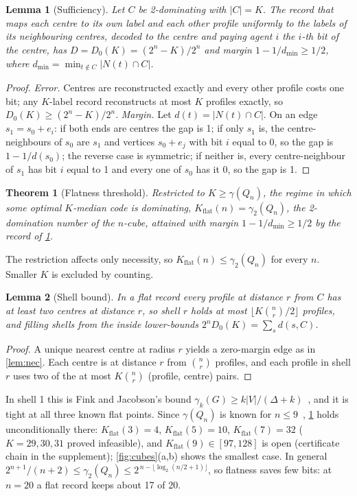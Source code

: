 \documentclass[sigconf,anonymous,acmthm=false]{aamas}
\theoremstyle{acmplain}
\newtheorem{theorem}{Theorem}
\newtheorem{lemma}{Lemma}
\theoremstyle{acmdefinition}
\newcommand{\Kflat}{K_{\mathrm{flat}}}
\newcommand{\dmin}{d_{\min}}
\begin{document}
\begin{lemma}[Sufficiency]\label{lem:suff}
Let $C$ be 2-dominating with $|C|=K$. The record that maps each centre to its own label and
each other profile uniformly to the labels of its neighbouring centres, decoded to the centre
and paying agent $i$ the $i$-th bit of the centre, has $D=D_0(K)=(2^n-K)/2^n$ and margin
$1-1/\dmin\ge1/2$, where $\dmin=\min_{t\notin C}|N(t)\cap C|$.
\end{lemma}
\begin{proof}
\emph{Error.} Centres are reconstructed exactly and every other profile costs one bit; any
$K$-label record reconstructs at most $K$ profiles exactly, so $D_0(K)\ge(2^n-K)/2^n$.
\emph{Margin.} Let $d(t)=|N(t)\cap C|$. On an edge $s_1=s_0+e_i$: if both ends are centres the
gap is 1; if only $s_1$ is, the centre-neighbours of $s_0$ are $s_1$ and vertices $s_0+e_j$
with bit $i$ equal to 0, so the gap is $1-1/d(s_0)$; the reverse case is symmetric; if
neither is, every centre-neighbour of $s_1$ has bit $i$ equal to 1 and every one of $s_0$ has
it 0, so the gap is 1.
\end{proof}

\begin{theorem}[Flatness threshold]\label{thm:flat}
Restricted to $K\ge\gamma(Q_n)$, the regime in which some optimal $K$-median code is
dominating, $\Kflat(n)=\gamma_2(Q_n)$, the 2-domination number of the $n$-cube, attained with
margin $1-1/\dmin\ge1/2$ by the record of \cref{lem:suff}.
\end{theorem}

The restriction affects only necessity, so $\Kflat(n)\le\gamma_2(Q_n)$ for every $n$. Smaller
$K$ is excluded by counting.

\begin{lemma}[Shell bound]\label{lem:shell}
In a flat record every profile at distance $r$ from $C$ has at least two centres at distance
$r$, so shell $r$ holds at most $\lfloor K\binom nr/2\rfloor$ profiles, and filling shells from
the inside lower-bounds $2^nD_0(K)=\sum_sd(s,C)$.
\end{lemma}
\begin{proof}
A unique nearest centre at radius $r$ yields a zero-margin edge as in \cref{lem:nec}. Each
centre is at distance $r$ from $\binom nr$ profiles, and each profile in shell $r$ uses two
of the at most $K\binom nr$ (profile, centre) pairs.
\end{proof}

In shell 1 this is Fink and Jacobson's bound $\gamma_k(G)\ge k|V|/(\Delta+k)$~\cite{fink1985ndomination},
and it is tight at all three known flat points. Since $\gamma(Q_n)$ is known for
$n\le9$~\cite{ostergard2001length9}, \cref{thm:flat} holds unconditionally there: $\Kflat(3)=4$,
$\Kflat(5)=10$, $\Kflat(7)=32$ ($K=29,30,31$ proved infeasible), and $\Kflat(9)\in[97,128]$ is
open (certificate chain in the supplement); \cref{fig:cubes}(a,b) shows the smallest case. In general
$2^{n+1}/(n+2)\le\gamma_2(Q_n)\le2^{\,n-\lfloor\log_2(n/2+1)\rfloor}$, so flatness saves few
bits: at $n=20$ a flat record keeps about 17 of 20.
\end{document}
